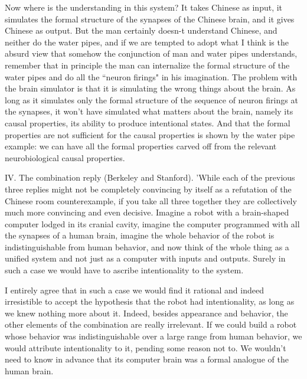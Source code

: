 Now where is the understanding in this system? It takes Chinese as input, it simulates the formal structure of
the synapses of the Chinese brain, and it gives Chinese as output. But the man certainly doesn-t understand
Chinese, and neither do the water pipes, and if we are tempted to adopt what I think is the absurd view that
somehow the conjunction of man and water pipes understands, remember that in principle the man can
internalize the formal structure of the water pipes and do all the ``neuron firings" in his imagination. The problem
with the brain simulator is that it is simulating the wrong things about the brain. As long as it simulates only the
formal structure of the sequence of neuron firings at the synapses, it won't have simulated what matters about
the brain, namely its causal properties, its ability to produce intentional states. And that the formal properties are
not sufficient for the causal properties is shown by the water pipe example: we can have all the formal
properties carved off from the relevant neurobiological causal properties.

IV. The combination reply (Berkeley and Stanford). 'While each of the previous three replies might not be
completely convincing by itself as a refutation of the Chinese room counterexample, if you take all three together they are collectively much more convincing and even decisive. Imagine a robot with a brain-shaped computer lodged in its cranial cavity, imagine the computer programmed with all the synapses of a human brain, imagine
the whole behavior of the robot is indistinguishable from human behavior, and now think of the whole thing as a
unified system and not just as a computer with inputs and outputs. Surely in such a case we would have to
ascribe intentionality to the system.

I entirely agree that in such a case we would find it rational and indeed irresistible to accept the hypothesis that
the robot had intentionality, as long as we knew nothing more about it. Indeed, besides appearance and
behavior, the other elements of the combination are really irrelevant. If we could build a robot whose behavior
was indistinguishable over a large range from human behavior, we would attribute intentionality to it, pending
some reason not to. We wouldn't need to know in advance that its computer brain was a formal analogue of the
human brain.

